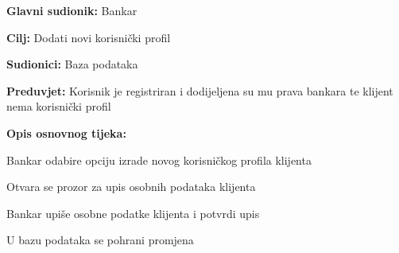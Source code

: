             \noindent {}
            \begin{packed_item}
            
              \item \textbf{Glavni sudionik: }Bankar
              \item  \textbf{Cilj:} Dodati novi korisnički profil
              \item  \textbf{Sudionici:} Baza podataka
              \item  \textbf{Preduvjet:} Korisnik je registriran i dodijeljena su mu prava bankara te klijent nema korisnički profil
              \item  \textbf{Opis osnovnog tijeka:}
              
              \item[] \begin{packed_enum}
            
                \item  Bankar odabire opciju izrade novog korisničkog profila klijenta
                \item  Otvara se prozor za upis osobnih podataka klijenta
                \item  Bankar upiše osobne podatke klijenta i potvrdi upis
                \item  U bazu podataka se pohrani promjena
              \end{packed_enum}
              
            \end{packed_item}
            
